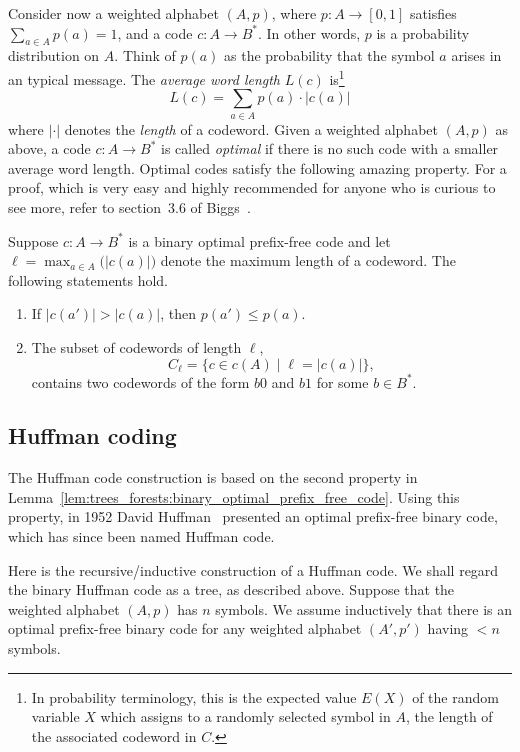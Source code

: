 Consider now a weighted alphabet $(A,p)$, where
$p: A \to [0,1]$ satisfies $\sum_{a \in A}p(a) = 1$, and a
code $c: A \to B^*$. In other words, $p$ is a probability
distribution on $A$. Think of $p(a)$ as the probability that the
symbol $a$ arises in an typical message. The
\emph{average word length} $L(c)$ is\footnote{
  In probability terminology, this is the expected value $E(X)$ of the
  random variable $X$ which assigns to a randomly selected symbol in
  $A$, the length of the associated codeword in $C$.
}
\[
L(c)
=
\sum_{a \in A} p(a) \cdot |c(a)|
\]
where $|\cdot|$ denotes the \emph{length} of a codeword.
Given a weighted alphabet $(A,p)$ as above, a code
$c: A \to B^*$ is called \emph{optimal} if there is no
such code with a smaller average word length.
Optimal codes satisfy the following amazing property. For a proof,
which is very easy and highly recommended for anyone who is curious to
see more, refer to section~3.6 of Biggs~\cite{Biggs2009}.

\begin{lemma}
\label{lem:trees_forests:binary_optimal_prefix_free_code}
Suppose $c: A \to B^*$ is a binary optimal prefix-free
code and let $\ell = \max_{a \in A} \big(|c(a)|\big)$ denote the
maximum length of a codeword. The following statements hold.
%
\begin{enumerate}
\item If $|c(a')|>|c(a)|$, then $p(a')\leq p(a)$.

\item The subset of codewords of length $\ell$,
\[
C_\ell
=
\{c \in c(A) \;|\; \ell = |c(a)|\},
\]
contains two codewords of the form $b0$ and $b1$ for some $b \in B^*$.
\end{enumerate}
\end{lemma}



\subsection{Huffman coding}

The Huffman code construction is based on the second property in
Lemma~\ref{lem:trees_forests:binary_optimal_prefix_free_code}. Using
this property, in 1952 David Huffman~\cite{Huffman1952} presented an
optimal prefix-free binary code, which has since been named Huffman
code.

Here is the recursive/inductive construction of a Huffman code. We
shall regard the binary Huffman code as a tree, as described
above. Suppose that the weighted alphabet $(A,p)$ has $n$ symbols. We
assume inductively that there is an optimal prefix-free binary code
for any weighted alphabet $(A',p')$ having $<n$ symbols.

